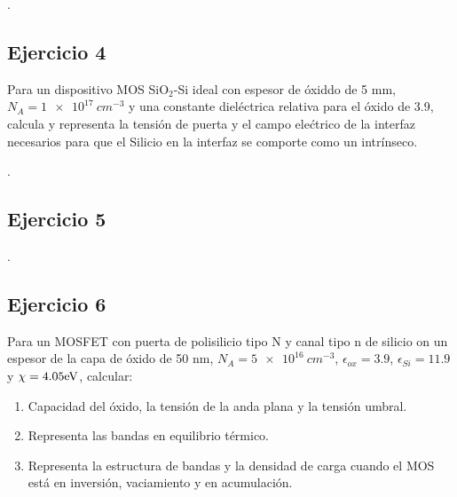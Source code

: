 \vspace*{1em}

\lipsum[1].


\begin{Enunciado}
	\subsection*{Ejercicio 4}
    
	Para un dispositivo MOS SiO$_2$-Si ideal con espesor de óxiddo de 5 mm, $N_A = \SI{1e17}{cm^{-3}}$ y una constante dieléctrica relativa para el óxido de 3.9, calcula y representa la tensión de puerta y el campo elećtrico de la interfaz necesarios para que el Silicio en la interfaz se comporte como un intrínseco. 
\end{Enunciado}

\vspace*{1em}

\lipsum[1].

\vspace*{2em}

\begin{Enunciado}
	\subsection*{Ejercicio 5}
    
	\lipsum[1].
\end{Enunciado}

\vspace*{1em}

\lipsum[1]

\vspace*{2em}


\begin{Enunciado}
	\subsection*{Ejercicio 6}
	Para un MOSFET con puerta de polisilicio tipo N y canal tipo n de silicio on un espesor de la capa de óxido de 50 nm, $N_A = \SI{5e16}{cm^{-3}}$, $\epsilon_{ox}=3.9$, $\epsilon_{Si} = 11.9$ y $\chi=4.05 \text{eV}$, calcular:
	\begin{enumerate}[label=\alph*)]
		\item Capacidad del óxido, la tensión de la anda plana y la tensión umbral.
		\item Representa las bandas en equilibrio térmico.
		\item Representa la estructura de bandas y la densidad de carga cuando el MOS está en inversión, vaciamiento y en acumulación.
	\end{enumerate}
\end{Enunciado}

